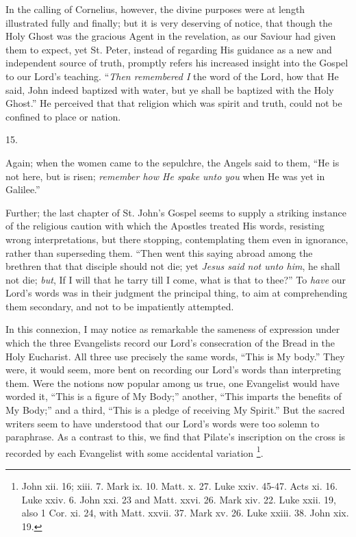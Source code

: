 In the calling of Cornelius, however, the divine purposes were at
length illustrated fully and finally; but it is very deserving of
notice, that though the Holy Ghost was the gracious Agent in the
revelation, as our Saviour had given them to expect, yet St. Peter,
instead of regarding His guidance as a new and independent source of
truth, promptly refers his increased insight into the Gospel to our
Lord's teaching. ``\emph{Then remembered I} the word of the Lord,
how that He said, John indeed baptized with water, but ye shall be
baptized with the Holy Ghost.'' He perceived that that religion
which was spirit and truth, could not be confined to place or nation.

15.

Again; when the women came to the sepulchre, the Angels said to
them, ``He is not here, but is risen; \emph{remember how He
spake unto you} when He was yet in Galilee.''

Further; the last chapter of St. John's Gospel seems to supply a
striking instance of the religious caution with which the Apostles
treated His words, resisting wrong interpretations, but there
stopping, contemplating them even in ignorance, rather than
superseding them. ``Then went this saying abroad among the
brethren that that disciple should not die; yet \emph{Jesus said not unto
him}, he shall not die; \emph{but}, If I will that he tarry till I
come, what is that to thee?'' To \emph{have} our Lord's words was
in their judgment the principal thing, to aim at comprehending them
secondary, and not to be impatiently attempted.

In this connexion, I may notice as remarkable the sameness of
expression under which the three Evangelists record our Lord's
consecration of the Bread in the Holy Eucharist. All three use
precisely the same words, ``This is My body.'' They were, it
would seem, more bent on recording our Lord's words than interpreting
them. Were the notions now popular among us true, one Evangelist would
have worded it, ``This is a figure of My Body;'' another,
``This imparts the benefits of My Body;'' and a third,
``This is a pledge of receiving My Spirit.'' But the sacred
writers seem to have understood that our Lord's words were too solemn
to paraphrase. As a contrast to this, we find that Pilate's
inscription on the cross is recorded by each Evangelist with some
accidental variation \footnote{John xii. 16; xiii. 7. Mark ix. 10. Matt.
x. 27. Luke xxiv. 45-47. Acts xi. 16. Luke xxiv. 6. John xxi. 23 and
Matt. xxvi. 26. Mark xiv. 22. Luke xxii. 19, also 1 Cor. xi. 24, with
Matt. xxvii. 37. Mark xv. 26. Luke xxiii. 38. John xix. 19.}.


